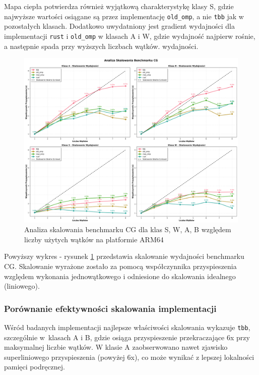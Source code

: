 Mapa ciepła potwierdza również wyjątkową charakterystykę klasy S, gdzie najwyższe wartości osiągane są przez implementację \texttt{old\_omp}, a nie \texttt{tbb} jak w pozostałych klasach. Dodatkowo uwydatniony jest gradient wydajności dla implementacji \texttt{rust} i \texttt{old\_omp} w klasach A i W, gdzie wydajność najpierw rośnie, a następnie spada przy wyższych liczbach wątków. wydajności.

\begin{figure}[H]
    \centering
    \includegraphics[width=\textwidth]{analiza/images/parallel/cg/x86/cg_analiza_skalowania.png}
    \caption{Analiza skalowania benchmarku CG dla klas S, W, A, B względem liczby użytych wątków na platformie ARM64}
    \label{cg_analiza_skalowania_x86_64}
\end{figure}
Powyższy wykres - rysunek \ref{cg_analiza_skalowania_x86_64} przedstawia skalowanie wydajności benchmarku CG. Skalowanie wyrażone zostało za pomocą współczynnika przyspieszenia względem wykonania jednowątkowego i odniesione do skalowania idealnego (liniowego).
\subsubsection{Porównanie efektywności skalowania implementacji}
Wśród badanych implementacji najlepsze właściwości skalowania wykazuje \texttt{tbb}, szczególnie w~klasach A i B, gdzie osiąga przyspieszenie przekraczające 6x przy maksymalnej liczbie wątków. W klasie A zaobserwowano nawet zjawisko superliniowego przyspieszenia (powyżej 6x), co może wynikać z lepszej lokalności pamięci podręcznej.

